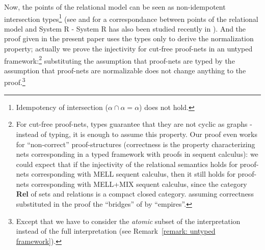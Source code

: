 \documentclass{article}
\theoremstyle{plain}
\begin{document}
Now, the points of the relational model can be seen as non-idempotent intersection types\footnote{Idempotency of intersection ($\alpha \cap \alpha = \alpha$) does not hold.}  (see \cite{phddecarvalho} and \cite{Carvalhoexecution} for a correspondance between points of the relational model and System R - System R has also been studied recently in \cite{inhabitation}). And the proof given in the present paper uses the types only to derive the normalization property; actually we prove the injectivity for cut-free proof-nets in an untyped framework:\footnote{For cut-free proof-nets, types guarantee that they are not cyclic as graphs - instead of typing, it is enough to assume this property. Our proof even works for ``non-correct'' proof-structures (correctness is the property characterizing nets corresponding in a typed framework with proofs in sequent calculus): we could expect that if the injectivity of the relational semantics holds for proof-nets corresponding with MELL sequent calculus, then it still holds for proof-nets corresponding with MELL+MIX sequent calculus, since the category \textbf{Rel} of sets and relations is a compact closed category. \cite{k=2} assuming correctness substituted in the proof the ``bridges'' of \cite{LPSinjectivity}  by ``empires''.} substituting the assumption that proof-nets are typed by the assumption that proof-nets are normalizable does not change anything to the proof.\footnote{Except that we have to consider the \emph{atomic} subset of the interpretation instead of the full interpretation (see Remark~\ref{remark: untyped framework}).} 
\end{document}
